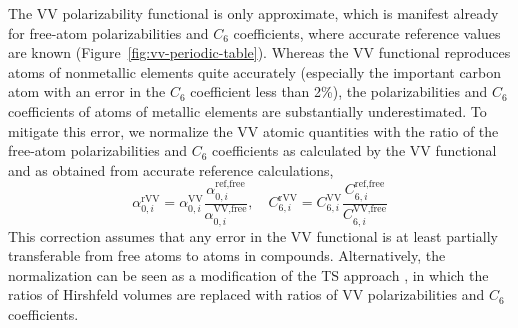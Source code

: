 The VV polarizability functional is only approximate, which is manifest already for free-atom polarizabilities and $C_6$ coefficients, where accurate reference values are known (Figure~\ref{fig:vv-periodic-table}).
Whereas the VV functional reproduces atoms of nonmetallic elements quite accurately (especially the important carbon atom with an error in the $C_6$ coefficient less than 2\%), the polarizabilities and $C_6$ coefficients of atoms of metallic elements are substantially underestimated.
To mitigate this error, we normalize the VV atomic quantities with the ratio of the free-atom polarizabilities and $C_6$ coefficients as calculated by the VV functional and as obtained from accurate reference calculations,
\begin{equation}
  \alpha_{0,i}^\text{rVV}
    =\alpha_{0,i}^\mathrm{VV}
    \frac{\alpha_{0,i}^\text{ref,free}}{\alpha_{0,i}^\text{VV,free}},\quad
  C_{6,i}^\text{rVV}
    =C_{6,i}^\mathrm{VV}\frac{C_{6,i}^\text{ref,free}}{C_{6,i}^\text{VV,free}}
\end{equation}
This correction assumes that any error in the VV functional is at least partially transferable from free atoms to atoms in compounds.
Alternatively, the normalization can be seen as a modification of the TS approach \citep{TkatchenkoPRL09}, in which the ratios of Hirshfeld volumes are replaced with ratios of VV polarizabilities and $C_6$ coefficients.


